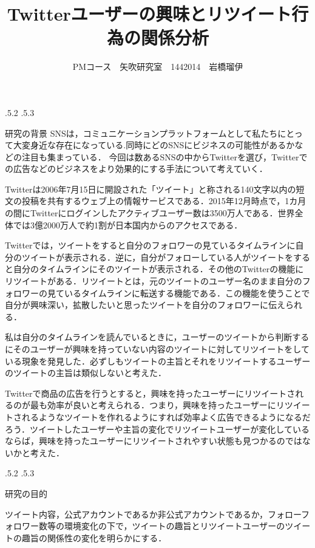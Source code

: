 \documentclass[uplatex]{jsarticle}
\title{\vspace{-14mm}Twitterユーザーの興味とリツイート行為の関係分析}
\author{PMコース　矢吹研究室　1442014　岩橋瑠伊}
\date{}%
\makeatletter
\renewcommand{\section}{%
    \if@slide\clearpage\fi
    \@startsection{section}{1}{\z@}%
    {\Cvs \@plus.5\Cdp \@minus.2\Cdp}%
    {.5\Cvs \@plus.3\Cdp}%
    {\normalfont\raggedright}}
\makeatother
\begin{document}
\maketitle





\section{研究の背景}
SNSは，コミュニケーションプラットフォームとして私たちにとって大変身近な存在になっている.同時にどのSNSにビジネスの可能性があるかなどの注目も集まっている．
今回は数あるSNSの中からTwitterを選び，Twitterでの広告などのビジネスをより効果的にする手法について考えていく\cite{sns}．

Twitterは2006年7月15日に開設された「ツイート」と称される140文字以内の短文の投稿を共有するウェブ上の情報サービスである．2015年12月時点で，1カ月の間にTwitterにログインしたアクティブユーザー数は3500万人である．世界全体では3億2000万人で約1割が日本国内からのアクセスである\cite{twitter}．

Twitterでは，ツイートをすると自分のフォロワーの見ているタイムラインに自分のツイートが表示される．逆に，自分がフォローしている人がツイートをすると自分のタイムラインにそのツイートが表示される．その他のTwitterの機能にリツイートがある．リツイートとは，元のツイートのユーザー名のまま自分のフォロワーの見ているタイムラインに転送する機能である．この機能を使うことで自分が興味深い，拡散したいと思ったツイートを自分のフォロワーに伝えられる．

私は自分のタイムラインを読んでいるときに，ユーザーのツイートから判断するにそのユーザーが興味を持っていない内容のツイートに対してリツイートをしている現象を発見した．必ずしもツイートの主旨とそれをリツイートするユーザーのツイートの主旨は類似しないと考えた．

Twitterで商品の広告を行うとすると，興味を持ったユーザーにリツイートされるのが最も効率が良いと考えられる．つまり，興味を持ったユーザーにリツイートされるようなツイートを作れるようにすれば効率よく広告できるようになるだろう．ツイートしたユーザーや主旨の変化でリツイートユーザーが変化しているならば，興味を持ったユーザーにリツイートされやすい状態も見つかるのではないかと考えた．

\section{研究の目的}

ツイート内容，公式アカウントであるか非公式アカウントであるか，フォローフォロワー数等の環境変化の下で，ツイートの趣旨とリツイートユーザーのツイートの趣旨の関係性の変化を明らかにする．
\end{document}
